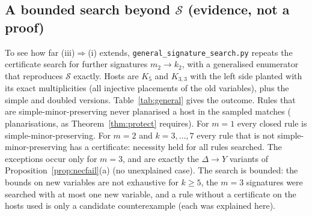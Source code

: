 \documentclass[10pt]{article}
\theoremstyle{definition}
\theoremstyle{plain}
\theoremstyle{remark}
\begin{document}
\subsection{A bounded search beyond $\mathcal S$ (evidence, not a proof)}\label{sec:general}
To see how far (iii)$\Rightarrow$(i) extends, \texttt{general\_signature\_search.py} repeats the certificate search for further signatures $m_2\to k_2$, with a generalised enumerator that reproduces $\mathcal S$ exactly. Hosts are $K_5$ and $K_{3,3}$ with the left side planted with its exact multiplicities (all injective placements of the old variables), plus the simple and doubled versions. Table~\ref{tab:general} gives the outcome. Rules that are simple-minor-preserving never planarised a host in the sampled matches ( planarisations, as Theorem~\ref{thm:protect} requires). For $m=1$ every closed rule is simple-minor-preserving. For $m=2$ and $k=3,\dots,7$ every rule that is not simple-minor-preserving has a certificate: necessity held for all rules searched. The exceptions occur only for $m=3$, and are exactly the $\Delta\to Y$ variants of Proposition~\ref{prop:necfail}(a) (no unexplained case). The search is bounded: the bounds on new variables are not exhaustive for $k\ge5$, the $m=3$ signatures were searched with at most one new variable, and a rule without a certificate on the hosts used is only a candidate counterexample (each was explained here).
\begin{table}[t]\centering\scriptsize
\resizebox{\textwidth}{!}{}
\caption{\textbf{Bounded} necessity search beyond $\mathcal S$ (closed loop-free rules up to renaming; ``s.m.'' abbreviates simple-minor-preserving); the bound on new variables $n_{\rm new}$ is shown for each signature and is not exhaustive for $k\ge5$. A rule with a certificate is proved to violate protection on one host; the table makes no claim about rules outside these bounds, and ``no certificate'' is only a candidate counterexample. ``Not s.m., no certificate'' is split by the explanation found.}\label{tab:general}
\end{table}
\end{document}
